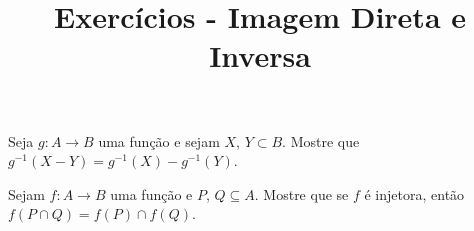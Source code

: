 \documentclass{beamer}
\title{Exercícios - Imagem Direta e Inversa}
\author[\autor]{\autor}
\institute[\instituto]{\instituto}
\date{}
\begin{document}
    \begin{frame}
        \maketitle
    \end{frame}


    \begin{frame}
        \begin{exercicio}
            Seja $g : A\to B$ uma fun{\c c}{\~a}o e sejam $X$, $Y\subset B$. Mostre que $g^{-1}(X - Y)= g^{-1}(X) - g^{-1}(Y)$.
        \end{exercicio}

    \end{frame}

    \begin{frame}
        \begin{exercicio}
            Sejam $f : A \to B$ uma fun{\c c}{\~a}o e $P$, $Q \subseteq A$. Mostre que se $f$ \'e injetora, ent{\~a}o $f(P \cap Q) = f(P) \cap f(Q)$.
        \end{exercicio}

    \end{frame}
\end{document}
